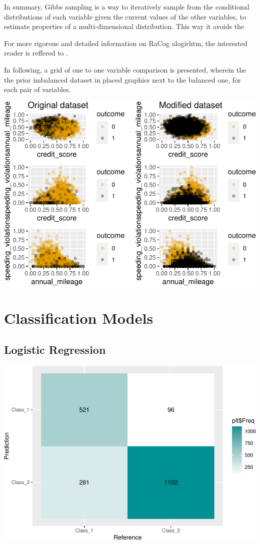 \documentclass{article}
\begin{document}
In summary, Gibbs sampling is a way to iteratively sample from the
conditional distributions of each variable given the current values of
the other variables, to estimate properties of a multi-dimensional
distribution. This way it avoids the

For more rigorous and detailed information on RaCog alogirhtm, the
interested reader is reffered to \cite{racog}.

In following, a grid of one to one variable comparison is presented,
wherein the the prior imbalanced dataset in placed graphics next to the
balanced one, for each pair of variables.

\includegraphics{report_files/figure-latex/unnamed-chunk-8-1.pdf}

\hypertarget{classification-models}{%
\section{Classification Models}\label{classification-models}}

\hypertarget{logistic-regression}{%
\subsection{\texorpdfstring{Logistic Regression
\label{subsec:logit}}{Logistic Regression }}\label{logistic-regression}}

\includegraphics{report_files/figure-latex/unnamed-chunk-12-1.pdf}
\end{document}
